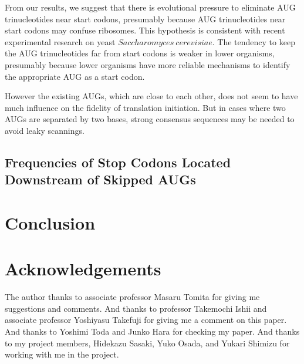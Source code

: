 From our results, we suggest that there is evolutional pressure to 
eliminate AUG trinucleotides near start codons, presumably because AUG 
trinucleotides near start codons may confuse ribosomes. This
hypothesis is consistent with recent experimental research on yeast
$Saccharomyces\:cerevisiae$\cite{label30}.
The tendency to keep the AUG trinucleotides far from start codons
is
weaker in lower organisms, presumably because lower organisms have
more reliable mechanisms to identify the appropriate AUG as a start codon.

However the existing AUGs, which are close to each other, does not
seem to have much influence on the fidelity of translation initiation. 
But in cases where two
AUGs are separated by two bases, strong consensus sequences may be 
needed to avoid leaky scannings.



\section{Frequencies of Stop Codons Located Downstream of Skipped AUGs}
\label{reinitia}



\newpage
\chapter{Conclusion}
\label{concl}


\chapter*{Acknowledgements}
The author thanks to associate professor Masaru Tomita for giving me
suggestions and comments. And thanks to professor Takemochi Ishii and
associate professor Yoshiyasu Takefuji for giving me a comment on this
paper. And thanks to Yoshimi Toda and Junko Hara for checking my
paper. And thanks to my project members, Hidekazu Sasaki, Yuko Osada,
and Yukari Shimizu for working with me in the project.

